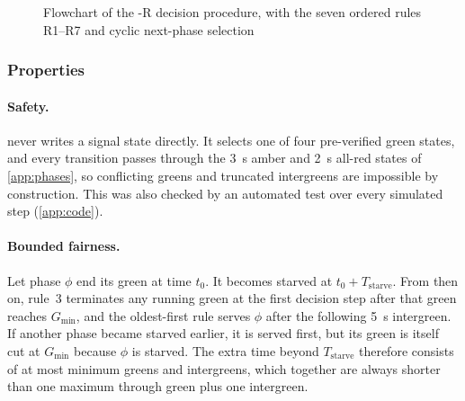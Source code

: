 \begin{figure}[htbp]
{}
\caption{Flowchart of the \prism{}-R decision procedure, with the seven ordered rules R1--R7 and cyclic
next-phase selection}\label{fig:impl-prism-flow}
\end{figure}

\subsubsection{Properties}

\paragraph{Safety.} \prism{} never writes a signal state directly. It selects one of four
pre-verified green states, and every transition passes through the 3~s amber and 2~s all-red
states of \cref{app:phases}, so conflicting greens and truncated intergreens are impossible by
construction. This was also checked by an automated test over every simulated step
(\cref{app:code}).

\paragraph{Bounded fairness.} Let phase $\phi$ end its green at time $t_0$. It becomes starved at
$t_0 + T_{\text{starve}}$. From then on, rule~3 terminates any running green at the first decision
step after that green reaches $G_{\min}$, and the oldest-first rule serves $\phi$ after the following
5~s intergreen. If another phase became starved earlier, it is served first, but its green is itself
cut at $G_{\min}$ because $\phi$ is starved. The extra time beyond $T_{\text{starve}}$ therefore
consists of at most minimum greens and intergreens, which together are always shorter than one
maximum through green plus one intergreen.

